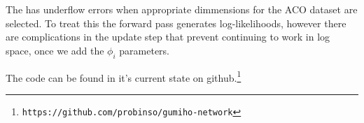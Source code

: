 \documentclass{article}
\begin{document}
\begin{multicols}{2}
The \GMM has underflow errors when appropriate dimmensions for the ACO dataset are selected.
To treat this the forward pass generates log-likelihoods, however there are complications in
the update step that prevent continuing to work in log space, once we add the $\phi_i$
parameters.




The code can be found in it's current state on github.\footnote{\texttt{https://github.com/probinso/gumiho-network}}

{}


\end{multicols}
\end{document}
